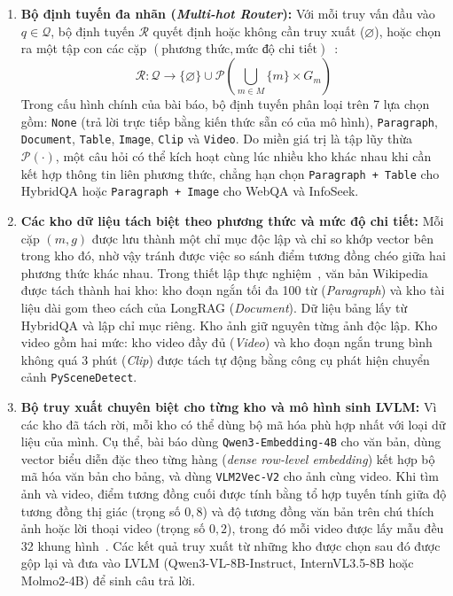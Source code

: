 \begin{enumerate}
    \item \textbf{Bộ định tuyến đa nhãn (\textit{Multi-hot Router}):} Với mỗi truy vấn đầu vào $q \in \mathcal{Q}$, bộ định tuyến $\mathcal{R}$ quyết định hoặc không cần truy xuất ($\varnothing$), hoặc chọn ra một tập con các cặp $(\text{phương thức}, \text{mức độ chi tiết})$~\cite{yeo2026universalrag}:
    \begin{equation}
        \mathcal{R}: \mathcal{Q} \longrightarrow \{\varnothing\} \cup \mathcal{P}\!\left(\bigcup_{m \in M} \{m\} \times G_m\right)
        \label{eq:ur_router_map}
    \end{equation}
    Trong cấu hình chính của bài báo, bộ định tuyến phân loại trên 7 lựa chọn gồm: \texttt{None} (trả lời trực tiếp bằng kiến thức sẵn có của mô hình), \texttt{Paragraph}, \texttt{Document}, \texttt{Table}, \texttt{Image}, \texttt{Clip} và \texttt{Video}. Do miền giá trị là tập lũy thừa $\mathcal{P}(\cdot)$, một câu hỏi có thể kích hoạt cùng lúc nhiều kho khác nhau khi cần kết hợp thông tin liên phương thức, chẳng hạn chọn \texttt{Paragraph + Table} cho HybridQA hoặc \texttt{Paragraph + Image} cho WebQA và InfoSeek.

    \item \textbf{Các kho dữ liệu tách biệt theo phương thức và mức độ chi tiết:} Mỗi cặp $(m, g)$ được lưu thành một chỉ mục độc lập và chỉ so khớp vector bên trong kho đó, nhờ vậy tránh được việc so sánh điểm tương đồng chéo giữa hai phương thức khác nhau. Trong thiết lập thực nghiệm~\cite{yeo2026universalrag}, văn bản Wikipedia được tách thành hai kho: kho đoạn ngắn tối đa 100 từ (\textit{Paragraph}) và kho tài liệu dài gom theo cách của LongRAG (\textit{Document}). Dữ liệu bảng lấy từ HybridQA và lập chỉ mục riêng. Kho ảnh giữ nguyên từng ảnh độc lập. Kho video gồm hai mức: kho video đầy đủ (\textit{Video}) và kho đoạn ngắn trung bình không quá 3 phút (\textit{Clip}) được tách tự động bằng công cụ phát hiện chuyển cảnh \texttt{PySceneDetect}.

    \item \textbf{Bộ truy xuất chuyên biệt cho từng kho và mô hình sinh LVLM:} Vì các kho đã tách rời, mỗi kho có thể dùng bộ mã hóa phù hợp nhất với loại dữ liệu của mình. Cụ thể, bài báo dùng \texttt{Qwen3-Embedding-4B} cho văn bản, dùng vector biểu diễn đặc theo từng hàng (\textit{dense row-level embedding}) kết hợp bộ mã hóa văn bản cho bảng, và dùng \texttt{VLM2Vec-V2} cho ảnh cùng video. Khi tìm ảnh và video, điểm tương đồng cuối được tính bằng tổ hợp tuyến tính giữa độ tương đồng thị giác (trọng số $0{,}8$) và độ tương đồng văn bản trên chú thích ảnh hoặc lời thoại video (trọng số $0{,}2$), trong đó mỗi video được lấy mẫu đều 32 khung hình~\cite{yeo2026universalrag}. Các kết quả truy xuất từ những kho được chọn sau đó được gộp lại và đưa vào LVLM (Qwen3-VL-8B-Instruct, InternVL3.5-8B hoặc Molmo2-4B) để sinh câu trả lời.
\end{enumerate}

